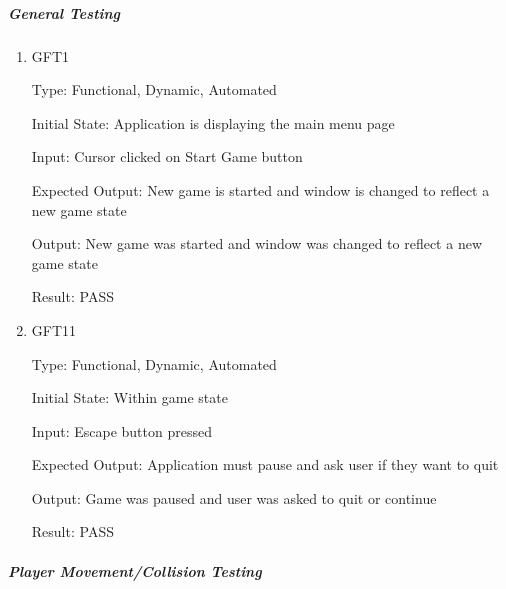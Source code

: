\documentclass[12pt, titlepage]{article}
\begin{document}
\subparagraph{General Testing}

\begin{enumerate}

\item{\label{gft1}{GFT1}\\}

Type: Functional, Dynamic, Automated
					
Initial State: Application is displaying the main menu page
					
Input: Cursor clicked on Start Game button
					
Expected Output: New game is started and window is changed to reflect a new game state

Output: New game was started and window was changed to reflect a new game state

Result: PASS

\setcounter{enumi}{10}
\item{\label{gft11}{GFT11}\\}

Type: Functional, Dynamic, Automated
					
Initial State: Within game state
					
Input: Escape button pressed
					
Expected Output: Application must pause and ask user if they want to quit

Output: Game was paused and user was asked to quit or continue

Result: PASS

\end{enumerate}

\subparagraph{Player Movement/Collision Testing}
\end{document}
